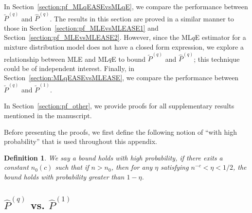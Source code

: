 \documentclass[a4paper]{article}
\newtheorem{definition}[fact]{Definition}
\renewcommand{\hat}{\widehat}
\begin{document}
In Section~\ref{section:pf_MLqEASEvsMLqE}, we compare the performance between $\widetilde{P}^{(q)}$ and $\hat{P}^{(q)}$. The results in this section are proved in a similar manner to those in Section~\ref{section:pf_MLEvsMLEASE1} and Section~\ref{section:pf_MLEvsMLEASE2}. However, since the ML$q$E estimator for a mixture distribution model does not have a closed form expression, we explore a relationship between MLE and ML$q$E to bound $\widetilde{P}^{(q)}$ and $\hat{P}^{(q)}$; this technique could be of independent interest. Finally, in Section~\ref{section:MLqEASEvsMLEASE}, we compare the performance between $\widetilde{P}^{(q)}$ and $\widetilde{P}^{(1)}$.

In Section~\ref{section:pf_other}, we provide proofs for all supplementary results mentioned in the manuscript.

Before presenting the proofs, we first define the following notion of ``with high probability'' that is used throughout this appendix.
\begin{definition}
We say a bound holds with high probability, if there exits a constant $n_0(c)$ such that if $n > n_0$, then for any $\eta$ satisfying $n^{-c} < \eta < 1/2$, the bound holds with probability greater than $1 - \eta$.
\end{definition}

\subsection{$\hat{P}^{(q)}$ vs. $\hat{P}^{(1)}$}
\label{section:pf_MLqEvsMLE}
\end{document}
